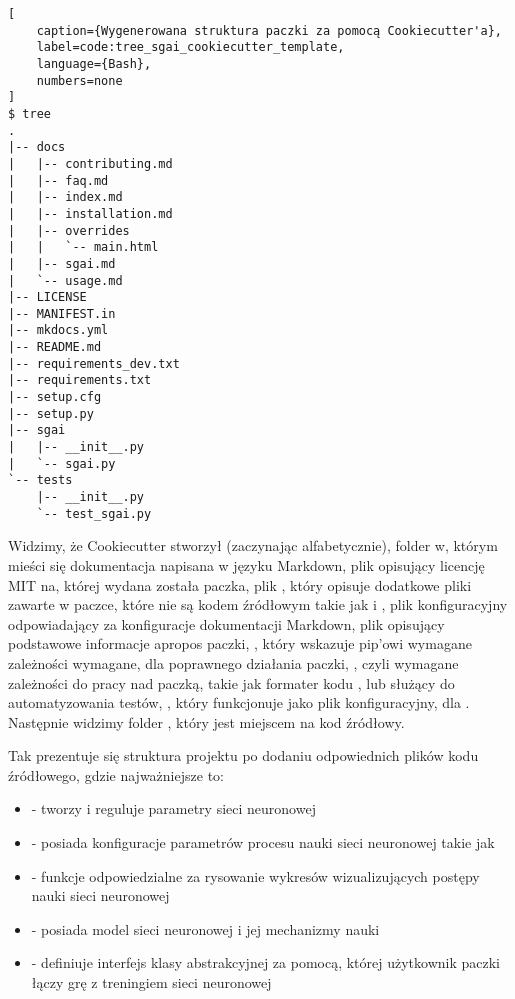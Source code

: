 \begin{onepage}
    \begin{lstlisting}[
    caption={Wygenerowana struktura paczki za pomocą Cookiecutter'a},
    label=code:tree_sgai_cookiecutter_template,
    language={Bash},
    numbers=none
]
$ tree
.
|-- docs
|   |-- contributing.md
|   |-- faq.md
|   |-- index.md
|   |-- installation.md
|   |-- overrides
|   |   `-- main.html
|   |-- sgai.md
|   `-- usage.md
|-- LICENSE
|-- MANIFEST.in
|-- mkdocs.yml
|-- README.md
|-- requirements_dev.txt
|-- requirements.txt
|-- setup.cfg
|-- setup.py
|-- sgai
|   |-- __init__.py
|   `-- sgai.py
`-- tests
    |-- __init__.py
    `-- test_sgai.py
    \end{lstlisting}
\end{onepage}


Widzimy, że Cookiecutter stworzył (zaczynając alfabetycznie), folder  w, którym mieści się dokumentacja napisana w języku Markdown, plik  opisujący licencję MIT \cite{LicencjaMIT} na, której wydana została paczka, plik , który opisuje dodatkowe pliki zawarte w paczce, które nie są kodem źródłowym takie jak  i , plik konfiguracyjny  odpowiadający za konfiguracje dokumentacji Markdown, plik  opisujący podstawowe informacje apropos paczki, , który wskazuje pip'owi wymagane zależności wymagane, dla poprawnego działania paczki, , czyli wymagane zależności do pracy nad paczką, takie jak formater kodu , lub  służący do automatyzowania testów, , który funkcjonuje jako plik konfiguracyjny, dla .
Następnie widzimy folder , który jest miejscem na kod źródłowy.


\clearpage

Tak prezentuje się struktura projektu po dodaniu odpowiednich plików kodu źródłowego, gdzie najważniejsze to:

\begin{itemize}
    \item {} - tworzy i reguluje parametry sieci neuronowej
    \item {} - posiada konfiguracje parametrów procesu nauki sieci neuronowej takie jak 
    \item {} - funkcje odpowiedzialne za rysowanie wykresów wizualizujących postępy nauki sieci neuronowej
    \item {} - posiada model sieci neuronowej i jej mechanizmy nauki
    \item {} - definiuje interfejs klasy abstrakcyjnej za pomocą, której użytkownik paczki łączy grę z treningiem sieci neuronowej
\end{itemize}

